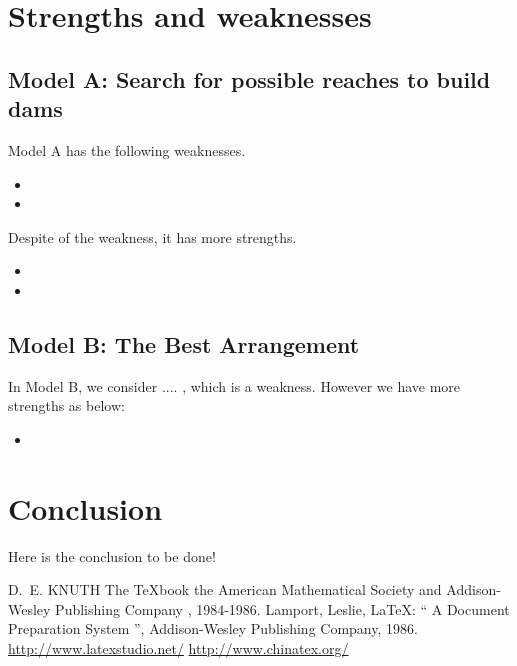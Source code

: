 \documentclass{mcmthesis}
\begin{document}



\section{Strengths and weaknesses}
\subsection{Model A: Search for possible reaches to build dams}
Model A has the following weaknesses.
\begin{itemize}
\item 
\item 
\end{itemize}
Despite of the weakness, it has more strengths.
\begin{itemize}
  \item 
  \item 
\end{itemize}

\subsection{Model B: The Best Arrangement}
In Model B, we consider .... , which is a weakness. However we have more strengths as below:
\begin{itemize}
  \item 
\end{itemize}

\section{Conclusion}
\indent \indent Here is the conclusion to be done!

\begin{thebibliography}{99}
 D.~E. KNUTH   The \TeX{}book  the American
Mathematical Society and Addison-Wesley
Publishing Company , 1984-1986.
Lamport, Leslie,  \LaTeX{}: `` A Document Preparation System '',
Addison-Wesley Publishing Company, 1986.
\url{http://www.latexstudio.net/}
\url{http://www.chinatex.org/}
\end{thebibliography}
\end{document}
